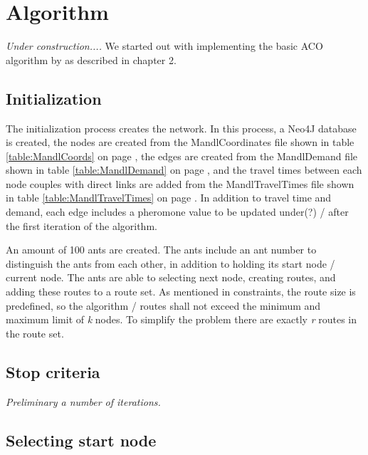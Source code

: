 \section{Algorithm}

\textit{Under construction....}
\newline
We started out with implementing the basic ACO algorithm by \citet{nanda11} as described in chapter 2.

\subsection{Initialization}

The initialization process creates the network. In this process, a Neo4J database is created, the nodes are created from the MandlCoordinates file shown in table \ref{table:MandlCoords} on page \pageref{table:MandlCoords}, the edges are created from the MandlDemand file shown in table \ref{table:MandlDemand} on page \pageref{table:MandlDemand}, and the travel times between each node couples with direct links are added from the MandlTravelTimes file shown in table \ref{table:MandlTravelTimes} on page \pageref{table:MandlTravelTimes}. In addition to travel time and demand, each edge includes a pheromone value to be updated under(?) / after the first iteration of the algorithm.
\par
An amount of 100 ants are created. The ants include an ant number to distinguish the ants from each other, in addition to holding its start node / current node. The ants are able to selecting next node, creating routes, and adding these routes to a route set. As mentioned in constraints, the route size is predefined, so the algorithm / routes shall not exceed the minimum and maximum limit of \textit{k} nodes. To simplify the problem there are exactly \textit{r} routes in the route set.

\subsection{Stop criteria}

\textit{Preliminary a number of iterations. }

\subsection{Selecting start node}
\begin{algorithm}[H]

 
\end{algorithm}

